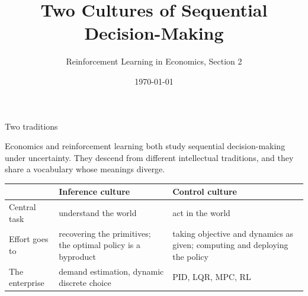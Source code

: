 

\title{Two Cultures of Sequential Decision-Making}
\subtitle{Reinforcement Learning in Economics, Section 2}
\date{\today}



\maketitle

\begin{frame}{Two traditions}

Economics and reinforcement learning both study sequential decision-making under
uncertainty. They descend from different intellectual traditions, and they share a
vocabulary whose meanings diverge.

\bigskip
\begin{tabularx}{\textwidth}{@{}l>{\raggedright\arraybackslash}X>{\raggedright\arraybackslash}X@{}}
\toprule
 & \color{rlblue}Inference culture & \color{rlorange}Control culture \\
\midrule
Central task
  & understand the world
  & act in the world \\[0.7em]
Effort goes to
  & recovering the primitives; the optimal policy is a byproduct
  & taking objective and dynamics as given; computing and deploying the policy \\[0.7em]
The enterprise
  & demand estimation, dynamic discrete choice
  & PID, LQR, MPC, RL \\
\bottomrule
\end{tabularx}
\end{frame}

